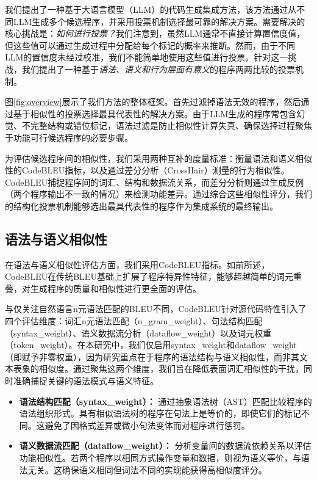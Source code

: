 \documentclass{article}
\begin{document}
我们提出了一种基于大语言模型（LLM）的代码生成集成方法，该方法通过从不同LLM生成多个候选程序，并采用投票机制选择最可靠的解决方案。需要解决的核心挑战是：{\em 如何进行投票？}我们注意到，虽然LLM通常不直接计算置信度值，但这些值可以通过生成过程中分配给每个标记的概率来推断。然而，由于不同LLM的置信度未经过校准，我们不能简单地使用这些值进行投票。针对这一挑战，我们提出了一种基于{\em 语法、语义和行为层面有意义}的程序两两比较的投票机制。

图\ref{fig:overview}展示了我们方法的整体框架。首先过滤掉语法无效的程序，然后通过基于相似性的投票选择最具代表性的解决方案。由于LLM生成的程序常包含幻觉、不完整结构或错位标记，语法过滤是防止相似性计算失真、确保选择过程聚焦于功能可行候选程序的必要步骤。

为评估候选程序间的相似性，我们采用两种互补的度量标准：衡量语法和语义相似性的CodeBLEU指标，以及通过差分分析（CrossHair）测量的行为相似性。CodeBLEU捕捉程序间的词汇、结构和数据流关系，而差分分析则通过生成反例（两个程序输出不一致的情况）来检测功能差异。通过综合这些相似性评分，我们的结构化投票机制能够选出最具代表性的程序作为集成系统的最终输出。
\subsection{语法与语义相似性}
在语法与语义相似性评估方面，我们采用CodeBLEU指标。如前所述，CodeBLEU在传统BLEU基础上扩展了程序特异性特征，能够超越简单的词元重叠，对生成程序的质量和相似性进行更全面的评估。

与仅关注自然语言n元语法匹配的BLEU不同，CodeBLEU针对源代码特性引入了四个评估维度：词汇n元语法匹配（n\_gram\_weight）、句法结构匹配（syntax\_weight）、语义数据流分析（dataflow\_weight）以及词元权重（token\_weight）。在本研究中，我们仅启用syntax\_weight和dataflow\_weight（即赋予非零权重），因为研究重点在于程序的语法结构与语义相似性，而非其文本表象的相似度。通过聚焦这两个维度，我们旨在降低表面词汇相似性的干扰，同时准确捕捉关键的语法模式与语义特征。

\begin{itemize}
    \item \textbf{语法结构匹配（syntax\_weight）：}
通过抽象语法树（AST）匹配比较程序的语法组织形式。具有相似语法树的程序在句法上是等价的，即使它们的标记不同。这避免了因格式差异或微小句法变体而对程序进行惩罚。
    \item \textbf{语义数据流匹配（dataflow\_weight）：}
分析变量间的数据流依赖关系以评估功能相似性。若两个程序以相同方式操作变量和数据，则视为语义等价，与语法无关。这确保语义相同但词法不同的实现能获得高相似度评分。
\end{itemize}
\end{document}

